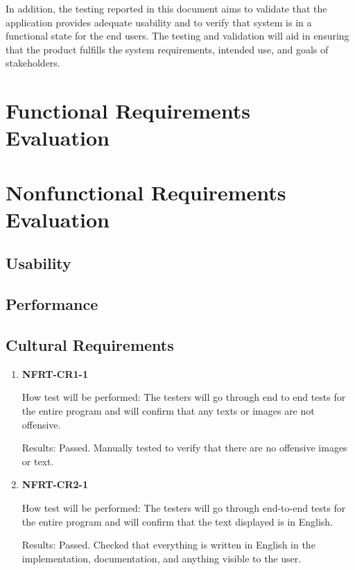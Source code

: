 \documentclass[12pt, titlepage]{article}
\begin{document}
In addition, the testing reported in this document aims to validate that the application provides
adequate usability and to verify that system is in a functional state for the end users. The
testing and validation will aid in ensuring that the product fulfills the system requirements,
intended use, and goals of stakeholders.

\section{Functional Requirements Evaluation}

\section{Nonfunctional Requirements Evaluation}

\subsection{Usability}

\subsection{Performance}

\subsection{Cultural Requirements}
\begin{enumerate}
	\item \textbf{NFRT-CR1-1}

	      How test will be performed: The testers will go through end to end tests for the entire program and
	      will confirm that any texts or images are not offensive.

	      Results: Passed. Manually tested to verify that there are no offensive images or text.

	\item \textbf{NFRT-CR2-1}

	      How test will be performed: The testers will go through end-to-end tests for the entire program and
	      will confirm that the text displayed is in English.

	      Results: Passed. Checked that everything is written in English in the implementation,
	      documentation, and anything visible to the user.

\end{enumerate}
\end{document}
